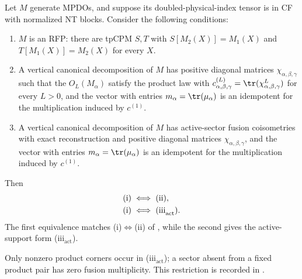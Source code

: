 \begin{theorem}
    \label{thm:mpdo_cpsv_bnt_rfp_equivalence}
    \leanok
    Let $M$ generate MPDOs, and suppose its doubled-physical-index tensor is
    in CF with normalized NT blocks. Consider the following conditions:
    \begin{enumerate}
        \item[(i)] $M$ is an RFP: there are tpCPM $S,T$ with
              $S[M_2(X)]=M_1(X)$ and $T[M_1(X)]=M_2(X)$ for every $X$.
        \item[(ii)] A vertical canonical decomposition of $M$ has positive
              diagonal matrices $\chi_{\alpha,\beta,\gamma}$ such that
              the $O_L(M_\alpha)$ satisfy the product law with
              $c^{(L)}_{\alpha,\beta,\gamma}
                  =\tr(\chi_{\alpha,\beta,\gamma}^{L})$ for every $L>0$,
              and the vector with entries $m_\alpha=\tr(\mu_\alpha)$ is an
              idempotent for the multiplication induced by $c^{(1)}$.
        \item[(iii$_{\mathrm{act}}$)] A vertical canonical decomposition of
              $M$ has active-sector fusion coisometries with exact
              reconstruction and positive diagonal matrices
              $\chi_{\alpha,\beta,\gamma}$, and the vector with entries
              $m_\alpha=\tr(\mu_\alpha)$ is an idempotent for the
              multiplication induced by $c^{(1)}$.
    \end{enumerate}
    Then
    \begin{align}
        \textnormal{(i)} & \iff\textnormal{(ii)}, \notag                       \\
        \textnormal{(i)} & \iff\textnormal{(iii}_{\mathrm{act}}\textnormal{)}.
        \label{eq:mpdo_cpsv_bnt_rfp_equivalence}
    \end{align}
    The first equivalence matches (i)$\iff$(ii) of
    \cite[Theorem~4.14]{Cirac2016MPDO_arXiv}, while the second gives the
    active-support form (iii$_{\mathrm{act}}$).

    Only nonzero product corners occur in (iii$_{\mathrm{act}}$);
    a sector absent from a fixed product pair has zero fusion multiplicity.
    This restriction is recorded in
    \cite{gap:cpsv16_bnt_uniqueness_zero_coefficient}.


\end{theorem}
